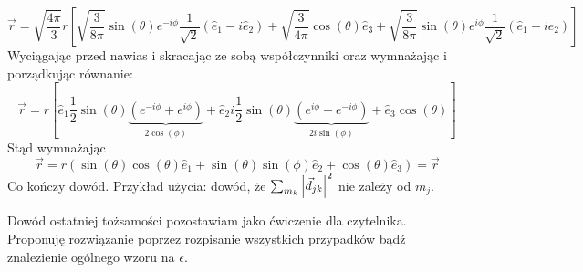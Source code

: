 \documentclass[a4paper,12pt]{article}
\begin{document}
\begin{equation*}
    \vec{r}  = \sqrt{\frac{4\pi}{3}} r \left[
    \sqrt{\frac{3}{8\pi}}\sin(\theta)e^{-i\phi}\frac{1}{\sqrt{2}} \left(
    \hat{e}_1 - i\hat{e}_2 \right) + \sqrt{\frac{3}{4\pi}}\cos(\theta)\hat{e}_3 +
    \sqrt{\frac{3}{8\pi}}\sin(\theta)e^{i\phi} \frac{1}{\sqrt{2}}\left(\hat{e}_1 +
  i\hat{e}_2 \right) \right]
\end{equation*}
Wyciągając przed nawias i skracając ze sobą współczynniki  oraz wymnażając i
porządkując równanie:
\begin{equation*}
  \vec{r} = r \left[ \hat{e}_1 \frac{1}{2} \sin(\theta) \underbrace{\left( e^{-i\phi} +
    e^{i\phi} \right)}_{2\cos(\phi)} + \hat{e}_2 i \frac{1}{2}\sin(\theta)
    \underbrace{\left( e^{i\phi} - e^{-i\phi} \right)}_{2i\sin(\phi)} +
  \hat{e}_3 \cos(\theta)\right]
\end{equation*}
Stąd wymnażając
\begin{equation*}
  \vec{r} = r\left( \sin(\theta) \cos(\theta) \hat{e}_1 + \sin(\theta)
  \sin(\phi) \hat{e}_2 + \cos(\theta) \hat{e}_3 \right) = \vec{r}
\end{equation*}
Co kończy dowód. Przykład użycia: dowód, że $\sum_{m_k} \abs{\vec{d}_{jk}}^2$ nie
zależy od $m_j$.

Dowód ostatniej tożsamości pozostawiam jako ćwiczenie dla czytelnika. Proponuję
rozwiązanie poprzez rozpisanie wszystkich przypadków bądź znalezienie ogólnego
wzoru na $\epsilon$.
\end{document}
